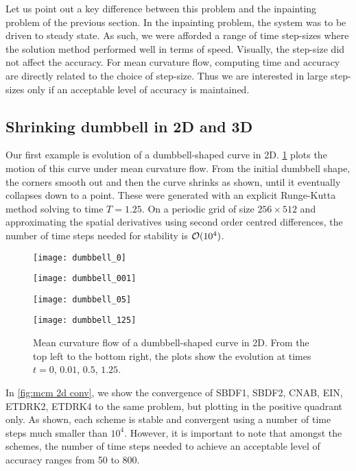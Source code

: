Let us point out a key difference between this problem and the inpainting problem of the previous section. In the inpainting problem, the system was to be driven to steady state. As such, we were afforded a range of time step-sizes where the solution method performed well in terms of speed. Visually, the step-size did not affect the accuracy. For mean curvature flow, computing time and accuracy are directly related to the choice of step-size. Thus we are interested in large step-sizes only if an acceptable level of accuracy is maintained.

\subsection{Shrinking dumbbell in 2D and 3D}
Our first example is evolution of a dumbbell-shaped curve in 2D. \cref{fig:mcm 2d dumbbell} plots the motion of this curve under mean curvature flow. From the initial dumbbell shape, the corners smooth out and then the curve shrinks as shown, until it eventually collapses down to a point. These were generated with an explicit Runge-Kutta method solving to time $T=1.25$. On a periodic grid of size $256\times 512$ and approximating the spatial derivatives using second order centred differences, the number of time steps needed for stability is $\mathcal{O}(10^4)$.

\begin{figure}[htb!]
        \centering
\begin{minipage}{0.48\textwidth}
        \texttt{[image: dumbbell\_0]}
\end{minipage}%
\begin{minipage}{0.48\textwidth}
        \texttt{[image: dumbbell\_001]}
\end{minipage}
\begin{minipage}{0.48\textwidth}
        \texttt{[image: dumbbell\_05]}
\end{minipage}%
\begin{minipage}{0.48\textwidth}
        \texttt{[image: dumbbell\_125]}
\end{minipage}%
\caption[Mean curvature flow of a dumbbell-shaped curve in 2D.]{Mean curvature flow of a dumbbell-shaped curve in 2D. From the top left to the bottom right, the plots show the evolution at times $t=0$, $0.01$, $0.5$, $1.25$.}
\label{fig:mcm 2d dumbbell}
\end{figure}

In \cref{fig:mcm 2d conv}, we show the convergence of SBDF1, SBDF2, CNAB, EIN, ETDRK2, ETDRK4 to the same problem, but plotting in the positive quadrant only. As shown, each scheme is stable and convergent  using a number of time steps much smaller than $10^4$. However, it is important to note that amongst the schemes, the number of time steps needed to achieve an acceptable level of accuracy ranges from 50 to 800. 

